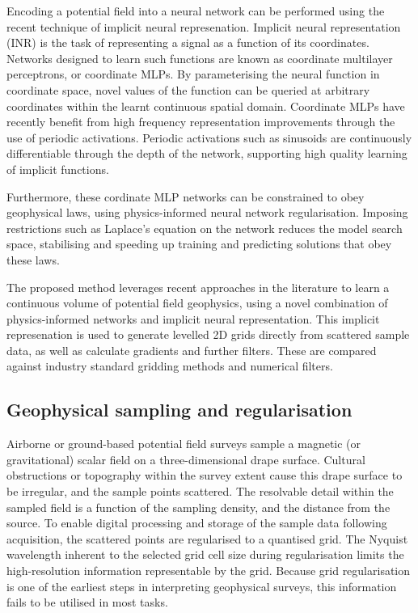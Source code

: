 \documentclass[manuscript.tex]{subfiles}
\begin{document}
Encoding a potential field into a neural network can be performed using the recent technique of implicit neural represenation.
Implicit neural representation (INR) is the task of representing a signal as a function of its coordinates.
Networks designed to learn such functions are known as coordinate multilayer perceptrons, or coordinate MLPs.
By parameterising the neural function in coordinate space, novel values of the function can be queried at arbitrary coordinates within the learnt continuous spatial domain.
Coordinate MLPs have recently benefit from high frequency representation improvements through the use of periodic activations.
Periodic activations such as sinusoids are continuously differentiable through the depth of the network, supporting high quality learning of implicit functions.

Furthermore, these cordinate MLP networks can be constrained to obey geophysical laws, using physics-informed neural network regularisation.
Imposing restrictions such as Laplace's equation on the network reduces the model search space, stabilising and speeding up training and predicting solutions that obey these laws.

The proposed method leverages recent approaches in the literature to learn a continuous volume of potential field geophysics, using a novel combination of physics-informed networks and implicit neural representation.
This implicit represenation is used to generate levelled 2D grids directly from scattered sample data, as well as calculate gradients and further filters.
These are compared against industry standard gridding methods and numerical filters.

\subsection{Geophysical sampling and regularisation}
\label{sec:geo_airborne}
Airborne or ground-based potential field surveys sample a magnetic (or gravitational) scalar field on a three-dimensional drape surface.
Cultural obstructions or topography within the survey extent cause this drape surface to be irregular, and the sample points scattered.
The resolvable detail within the sampled field is a function of the sampling density, and the distance from the source.
To enable digital processing and storage of the sample data following acquisition, the scattered points are regularised to a quantised grid.
The Nyquist wavelength inherent to the selected grid cell size during regularisation limits the high-resolution information representable by the grid.
Because grid regularisation is one of the earliest steps in interpreting geophysical surveys, this information fails to be utilised in most tasks.
\end{document}
